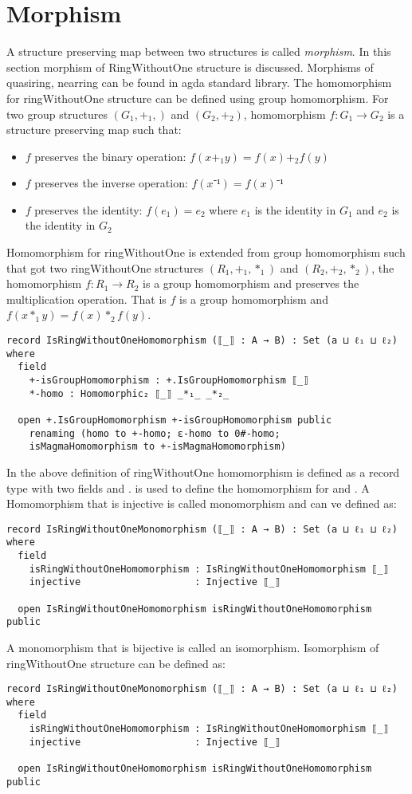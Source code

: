\section{Morphism} 
A structure preserving map between two structures is called \textit{morphism}.
In this section morphism of RingWithoutOne structure is discussed. Morphisms of
quasiring, nearring can be found in agda standard library. The homomorphism for
ringWithoutOne structure can be defined using group homomorphism. For two group
structures $(G_1,+_1,)$ and $(G_2,+_2)$, homomorphism $f:G_1 \rightarrow G_2$ is
a structure preserving map such that:
\begin{itemize}
  \item $f$ preserves the binary operation: $f(x +_1 y) = f(x) +_2 f(y)$
  \item $f$ preserves the inverse operation: $f(x⁻¹) = f(x)⁻¹$
  \item $f$ preserves the identity: $f(e_1) = e_2$ where $e_1$ is the identity
  in $G_1$ and $e_2$ is the identity in $G_2$
\end{itemize}
Homomorphism for ringWithoutOne is extended from group homomorphism such that
got two ringWithoutOne structures $(R_1,+_1,*_1)$ and $(R_2,+_2,*_2)$, the
homomorphism $f: R_1 \rightarrow R_2$ is a group homomorphism and preserves the
multiplication operation. That is $f$ is a group homomorphism and \(f(x *_1 y) =
f(x) *_2 f(y)\).
\begin{verbatim}
record IsRingWithoutOneHomomorphism (⟦_⟧ : A → B) : Set (a ⊔ ℓ₁ ⊔ ℓ₂) where
  field
    +-isGroupHomomorphism : +.IsGroupHomomorphism ⟦_⟧
    *-homo : Homomorphic₂ ⟦_⟧ _*₁_ _*₂_

  open +.IsGroupHomomorphism +-isGroupHomomorphism public
    renaming (homo to +-homo; ε-homo to 0#-homo;
    isMagmaHomomorphism to +-isMagmaHomomorphism)
\end{verbatim} 
In the above definition of ringWithoutOne homomorphism
 is defined as a record type with two
fields  and . 
is used to define the homomorphism for  and . A
Homomorphism that is injective is called monomorphism and can ve defined as:
\begin{verbatim}
record IsRingWithoutOneMonomorphism (⟦_⟧ : A → B) : Set (a ⊔ ℓ₁ ⊔ ℓ₂) where
  field
    isRingWithoutOneHomomorphism : IsRingWithoutOneHomomorphism ⟦_⟧
    injective                    : Injective ⟦_⟧

  open IsRingWithoutOneHomomorphism isRingWithoutOneHomomorphism public
\end{verbatim}
A monomorphism that is bijective is called an isomorphism. Isomorphism of
ringWithoutOne structure can be defined as:
\begin{verbatim}
record IsRingWithoutOneMonomorphism (⟦_⟧ : A → B) : Set (a ⊔ ℓ₁ ⊔ ℓ₂) where
  field
    isRingWithoutOneHomomorphism : IsRingWithoutOneHomomorphism ⟦_⟧
    injective                    : Injective ⟦_⟧

  open IsRingWithoutOneHomomorphism isRingWithoutOneHomomorphism public
\end{verbatim}

